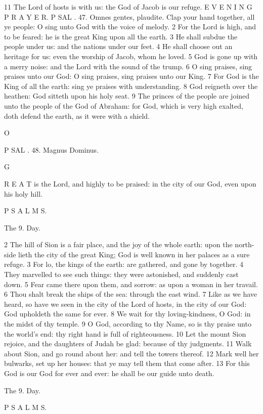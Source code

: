 11 The Lord of hosts is with us: the God of Jacob is our refuge. E V E N I N G P R A Y E R. P SAL . 47. Omnes gentes, plaudite. Clap your hand together, all ye people: O sing unto God with the voice of melody. 2 For the Lord is high, and to be feared: he is the great King upon all the earth. 3 He shall subdue the people under us: and the nations under our feet. 4 He shall choose out an heritage for us: even the worship of Jacob, whom he loved. 5 God is gone up with a merry noise: and the Lord with the sound of the trump. 6 O sing praises, sing praises unto our God: O sing praises, sing praises unto our King. 7 For God is the King of all the earth: sing ye praises with understanding. 8 God reigneth over the heathen: God sitteth upon his holy seat. 9 The princes of the people are joined unto the people of the God of Abraham: for God, which is very high exalted, doth defend the earth, as it were with a shield.

O

P SAL . 48. Magnus Dominus.

G

R E A T is the Lord, and highly to be praised: in the city of our God, even upon his holy hill.

P S A L M S.

The 9. Day.

2 The hill of Sion is a fair place, and the joy of the whole earth: upon the north-side lieth the city of the great King; God is well known in her palaces as a sure refuge. 3 For lo, the kings of the earth: are gathered, and gone by together. 4 They marvelled to see such things: they were astonished, and suddenly cast down. 5 Fear came there upon them, and sorrow: as upon a woman in her travail. 6 Thou shalt break the ships of the sea: through the east wind. 7 Like as we have heard, so have we seen in the city of the Lord of hosts, in the city of our God: God upholdeth the same for ever. 8 We wait for thy loving-kindness, O God: in the midst of thy temple. 9 O God, according to thy Name, so is thy praise unto the world’s end: thy right hand is full of righteousness. 10 Let the mount Sion rejoice, and the daughters of Judah be glad: because of thy judgments. 11 Walk about Sion, and go round about her: and tell the towers thereof. 12 Mark well her bulwarks, set up her houses: that ye may tell them that come after. 13 For this God is our God for ever and ever: he shall be our guide unto death.

The 9. Day.

P S A L M S.

